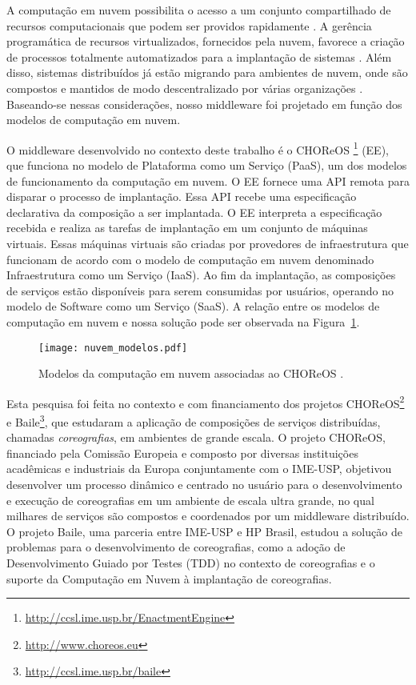 A computação em nuvem possibilita o acesso a um conjunto compartilhado de recursos computacionais que podem ser providos rapidamente \cite{Nist2011Cloud}.
A gerência programática de recursos virtualizados, fornecidos pela nuvem, favorece a criação de processos totalmente automatizados para a implantação de sistemas \cite{Humble2011Continuous}.   
Além disso, sistemas distribuídos já estão migrando para ambientes de nuvem, onde são compostos e mantidos de modo descentralizado por várias organizações \cite{Steen2011VeryLarge}.
Baseando-se nessas considerações, nosso middleware foi projetado em função dos modelos de computação em nuvem.

O middleware desenvolvido no contexto deste trabalho é o CHOReOS \ee 
\footnote{\url{http://ccsl.ime.usp.br/EnactmentEngine}} (EE),
que funciona no modelo de Plataforma como um Serviço (PaaS), 
um dos modelos de funcionamento da computação em nuvem.
O EE fornece uma API remota para disparar o processo de implantação.
Essa API recebe uma especificação declarativa da composição a ser implantada.
O EE interpreta a especificação recebida e realiza as tarefas de implantação
em um conjunto de máquinas virtuais.
Essas máquinas virtuais são criadas por provedores de infraestrutura que funcionam
de acordo com o modelo de computação em nuvem denominado Infraestrutura como um Serviço (IaaS).
Ao fim da implantação, as composições de serviços estão disponíveis para serem consumidas
por usuários, operando no modelo de Software como um Serviço (SaaS).
A relação entre os modelos de computação em nuvem e nossa solução
pode ser observada na Figura~\ref{fig:modelos_nuvem}. 

\begin{figure}[!h]
  \centering
  \texttt{[image: nuvem\_modelos.pdf]} 
  \caption{Modelos da computação em nuvem associadas ao CHOReOS \ee.}
  \label{fig:modelos_nuvem} 
\end{figure}

Esta pesquisa foi feita no contexto e com financiamento dos projetos CHOReOS\footnote{\url{http://www.choreos.eu}} e Baile\footnote{\url{http://ccsl.ime.usp.br/baile}}, que estudaram a aplicação de composições de serviços distribuídas, chamadas \emph{coreografias}, em ambientes de grande escala. O projeto CHOReOS, financiado pela Comissão Europeia e composto por diversas instituições acadêmicas e industriais da Europa conjuntamente com o IME-USP, objetivou desenvolver um processo dinâmico e centrado no usuário para o desenvolvimento e execução de coreografias em um ambiente de escala ultra grande, no qual milhares de serviços são compostos e coordenados por um middleware distribuído. O projeto Baile, uma parceria entre IME-USP e HP Brasil, estudou a solução de problemas para o desenvolvimento de coreografias, como a adoção de Desenvolvimento Guiado por Testes (TDD) no contexto de coreografias e o suporte da Computação em Nuvem à implantação de coreografias. 

